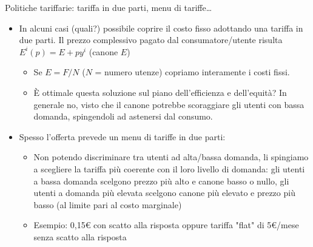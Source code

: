 \documentclass[aspectratio=64,11pt]{beamer}
\begin{document}
\begin{frame}{Politiche tariffarie: tariffa in due parti, menu di tariffe\ldots{}}
\begin{itemize}
\item In alcuni casi (quali?) possibile coprire il costo fisso adottando una
\alert{tariffa in due parti}. Il prezzo complessivo pagato dal consumatore/utente
risulta $E^i(p)=E+py^i$ (canone $E$)
\begin{itemize}
\item Se $E=F/N$ ($N$ = numero utenze) copriamo interamente i costi fissi.
\item È ottimale questa soluzione sul piano dell'efficienza e dell'equità? In
generale no, visto che il canone potrebbe scoraggiare gli utenti con bassa
domanda, spingendoli ad astenersi dal consumo.
\end{itemize}
\item Spesso l'offerta prevede un \alert{menu di tariffe in due parti}:
\begin{itemize}
\item Non potendo discriminare tra utenti ad alta/bassa domanda, li spingiamo a
scegliere la tariffa più coerente con il loro livello di domanda: gli
utenti a bassa domanda scelgono prezzo più alto e canone basso o nullo,
gli utenti a domanda più elevata scelgono canone più elevato e prezzo più
basso (al limite pari al costo marginale)
\item Esempio: 0,15€ con scatto alla risposta oppure tariffa "flat" di 5€/mese
senza scatto alla risposta
\end{itemize}
\end{itemize}
\end{frame}
\end{document}
